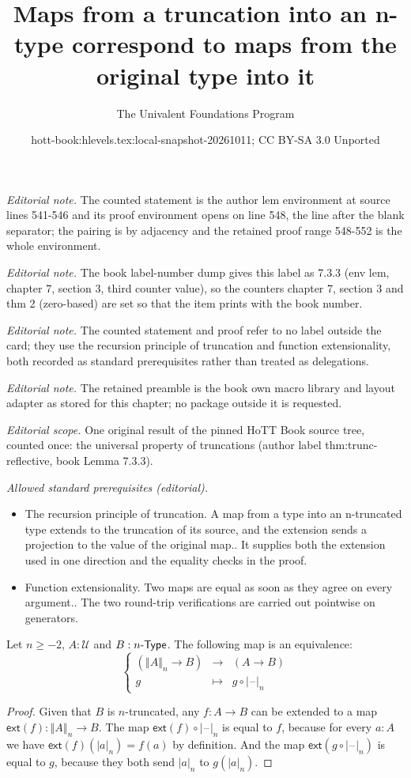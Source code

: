 \documentclass[10pt,a4paper]{article}
\title{Maps from a truncation into an n-type correspond to maps from the original type into it}
\author{The Univalent Foundations Program}
\date{hott-book:hlevels.tex:local-snapshot-20261011; CC BY-SA 3.0 Unported}
\newcounter{chapter}
\providecommand{\index}[1]{}
\newcommand{\ext}{\mathsf{ext}}
\newcommand{\UU}{\ensuremath{\mathcal{U}}\xspace}
\let\type\UU
\newcommand{\typele}[1]{\ensuremath{{#1}\text-\mathsf{Type}}\xspace}
\newcommand{\trunc}[2]{\mathopen{}\left\Vert #2\right\Vert_{#1}\mathclose{}}
\newcommand{\tproj}[3][]{\mathopen{}\left|#3\right|_{#2}^{#1}\mathclose{}}
\newcommand{\tprojf}[2][]{|\blank|_{#2}^{#1}}
\let\extendsmb\ext
\newcommand{\extend}[1]{\extendsmb(#1)}
\newcommand{\blank}{\mathord{\hspace{1pt}\text{--}\hspace{1pt}}}
\newcommand{\function}[4]{\left\{\begin{array}{rcl}#1 &
      \longrightarrow & #2 \\ #3 & \longmapsto & #4 \end{array}\right.}
\theoremstyle{definition}
\theoremstyle{remark}
\numberwithin{equation}{section}
\begin{document}
\maketitle
\setcounter{chapter}{7}
\setcounter{section}{3}
\setcounter{thm}{2}
\noindent\textit{Editorial note.} The counted statement is the author lem environment at source lines 541-546 and its proof environment opens on line 548, the line after the blank separator; the pairing is by adjacency and the retained proof range 548-552 is the whole environment.\par\medskip
\noindent\textit{Editorial note.} The book label-number dump gives this label as 7.3.3 (env lem, chapter 7, section 3, third counter value), so the counters chapter 7, section 3 and thm 2 (zero-based) are set so that the item prints with the book number.\par\medskip
\noindent\textit{Editorial note.} The counted statement and proof refer to no label outside the card; they use the recursion principle of truncation and function extensionality, both recorded as standard prerequisites rather than treated as delegations.\par\medskip
\noindent\textit{Editorial note.} The retained preamble is the book own macro library and layout adapter as stored for this chapter; no package outside it is requested.\par\medskip
\noindent\textit{Editorial scope.} One original result of the pinned HoTT Book source tree, counted once: the universal property of truncations (author label thm:trunc-reflective, book Lemma 7.3.3).\par\medskip
\noindent\textit{Allowed standard prerequisites (editorial).}\begin{itemize}
\item The recursion principle of truncation. A map from a type into an n-truncated type extends to the truncation of its source, and the extension sends a projection to the value of the original map.. It supplies both the extension used in one direction and the equality checks in the proof.
\item Function extensionality. Two maps are equal as soon as they agree on every argument.. The two round-trip verifications are carried out pointwise on generators.
\end{itemize}\medskip
\begin{lem}\label{thm:trunc-reflective}
  \index{universal!property!of truncation}%
  Let $n\ge-2$, $A:\type$ and $B:\typele{n}$. The following map is an
  equivalence:
  \[\function{(\trunc nA\to{}B)}{(A\to{}B)}{g}{g\circ\tprojf n}\]
\end{lem}

\begin{proof}
  Given that $B$ is $n$-truncated, any $f:A\to{}B$ can be extended to a map $\extend{f}:\trunc nA\to{}B$.
  The map $\extend{f}\circ\tprojf n$ is equal to $f$, because for every $a:A$ we have $\extend{f}(\tproj na)=f(a)$ by definition.
  And the map $\extend{g\circ\tprojf n}$ is equal to $g$, because they both send $\tproj na$ to $g(\tproj na)$.
\end{proof}
\end{document}
